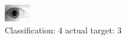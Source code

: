 \begin{figure}[h!]
\begin{center}
\includegraphics[width=0.60\columnwidth]{figures/ID1924_class_4_target_3.png}
\end{center}
\caption{ Classification: 4 actual target: 3}
\label{fig:ID1924_class_4_target_3}
\end{figure}

